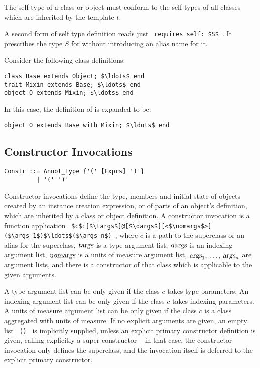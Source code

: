The self type of a class or object must conform to the self types of all classes which are inherited by the template $t$. 

A second form of self type definition reads just ~\lstinline!requires self: $S$!~. It prescribes the type $S$ for  without introducing an alias name for it. 


\example Consider the following class definitions:
\begin{lstlisting}
class Base extends Object; $\ldots$ end
trait Mixin extends Base; $\ldots$ end
object O extends Mixin; $\ldots$ end
\end{lstlisting}
In this case, the definition of  is expanded to be:
\begin{lstlisting}
object O extends Base with Mixin; $\ldots$ end
\end{lstlisting}





\subsection{Constructor Invocations}
\label{sec:constructor-invocations}

\syntax\begin{lstlisting}
Constr ::= Annot_Type {'(' [Exprs] ')'}
         | '(' ')'
\end{lstlisting}

Constructor invocations define the type, members and initial state of objects created by an instance creation expression, or of parts of an object's definition, which are inherited by a class or object definition. A constructor invocation is a function application ~\lstinline!$c$:[$\targs$]@[$\dargs$][<$\uomargs$>]($\args_1$)$\ldots$($\args_n$)!~, where $c$ is a path to the superclass or an alias for the superclass, $\mbox{\sl targs}$ is a type argument list, $\mbox{\sl dargs}$ is an indexing argument list, $\mbox{\sl uomargs}$ is a units of measure argument list, $\mbox{\sl args}_1 ,\, \ldots ,\, \mbox{\sl args}_n$ are argument lists, and there is a constructor of that class which is applicable to the given arguments. 

A type argument list can be only given if the class $c$ takes type parameters. An indexing argument list can be only given if the class $c$ takes indexing parameters. A units of measure argument list can be only given if the class $c$ is a class aggregated with units of measure. If no explicit arguments are given, an empty list ~\lstinline!()!~ is implicitly supplied, unless an explicit primary constructor definition is given, calling explicitly a super-constructor -- in that case, the constructor invocation only defines the superclass, and the invocation itself is deferred to the explicit primary constructor. 

